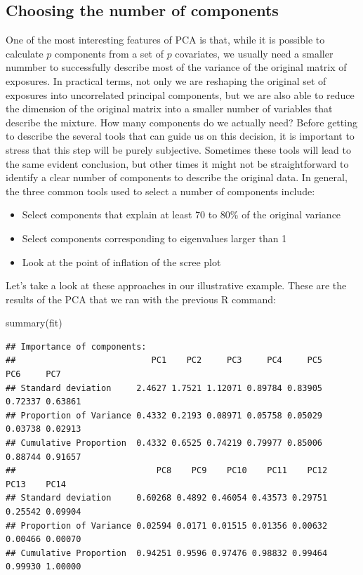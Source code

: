 \documentclass[
]{book}
\newenvironment{Shaded}{\begin{snugshade}}{\end{snugshade}}
\newcommand{\FunctionTok}[1]{\textcolor[rgb]{0.00,0.00,0.00}{#1}}
\newcommand{\NormalTok}[1]{#1}
\providecommand{\tightlist}{%
  \setlength{\itemsep}{0pt}\setlength{\parskip}{0pt}}
\begin{document}
\hypertarget{choosing-the-number-of-components}{%
\subsection{Choosing the number of components}\label{choosing-the-number-of-components}}

One of the most interesting features of PCA is that, while it is possible to calculate \(p\) components from a set of \(p\) covariates, we usually need a smaller nummber to successfully describe most of the variance of the original matrix of exposures. In practical terms, not only we are reshaping the original set of exposures into uncorrelated principal components, but we are also able to reduce the dimension of the original matrix into a smaller number of variables that describe the mixture. How many components do we actually need? Before getting to describe the several tools that can guide us on this decision, it is important to stress that this step will be purely subjective. Sometimes these tools will lead to the same evident conclusion, but other times it might not be straightforward to identify a clear number of components to describe the original data. In general, the three common tools used to select a number of components include:

\begin{itemize}
\tightlist
\item
  Select components that explain at least 70 to 80\% of the original variance
\item
  Select components corresponding to eigenvalues larger than 1
\item
  Look at the point of inflation of the scree plot
\end{itemize}

Let's take a look at these approaches in our illustrative example. These are the results of the PCA that we ran with the previous R command:

\begin{Shaded}
\begin{Highlighting}[]
\FunctionTok{summary}\NormalTok{(fit)}
\end{Highlighting}
\end{Shaded}

\begin{verbatim}
## Importance of components:
##                           PC1    PC2     PC3     PC4     PC5     PC6     PC7
## Standard deviation     2.4627 1.7521 1.12071 0.89784 0.83905 0.72337 0.63861
## Proportion of Variance 0.4332 0.2193 0.08971 0.05758 0.05029 0.03738 0.02913
## Cumulative Proportion  0.4332 0.6525 0.74219 0.79977 0.85006 0.88744 0.91657
##                            PC8    PC9    PC10    PC11    PC12    PC13    PC14
## Standard deviation     0.60268 0.4892 0.46054 0.43573 0.29751 0.25542 0.09904
## Proportion of Variance 0.02594 0.0171 0.01515 0.01356 0.00632 0.00466 0.00070
## Cumulative Proportion  0.94251 0.9596 0.97476 0.98832 0.99464 0.99930 1.00000
\end{verbatim}
\end{document}
